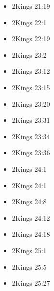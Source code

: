 \documentclass[14pt]{book}
\begin{document}
\begin{multicols}{2}
\begin{itemize}
													\item 2Kings 21:19
													
													\item 2Kings 22:1
													
													\item 2Kings 22:19
													
													\item 2Kings 23:2
													
													\item 2Kings 23:12
													
													\item 2Kings 23:15
													
													\item 2Kings 23:20
													
													\item 2Kings 23:31
													
													\item 2Kings 23:34
													
													\item 2Kings 23:36
													
													\item 2Kings 24:1
													
													\item 2Kings 24:1
													
													\item 2Kings 24:8
													
													\item 2Kings 24:12
													
													\item 2Kings 24:18
													
													\item 2Kings 25:1
													
													\item 2Kings 25:5
													
													\item 2Kings 25:27
\end{itemize}\end{multicols}
\end{document}
